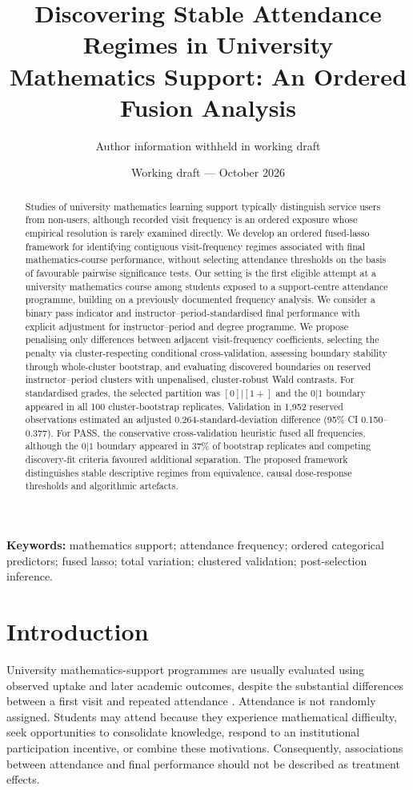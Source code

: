 \documentclass[11pt]{article}
\title{Discovering Stable Attendance Regimes in University Mathematics Support: An Ordered Fusion Analysis}
\author{Author information withheld in working draft}
\date{Working draft --- October 2026}
\begin{document}
\maketitle

\begin{abstract}
Studies of university mathematics learning support typically distinguish service users from non-users, although recorded visit frequency is an ordered exposure whose empirical resolution is rarely examined directly. We develop an ordered fused-lasso framework for identifying contiguous visit-frequency regimes associated with final mathematics-course performance, without selecting attendance thresholds on the basis of favourable pairwise significance tests. Our setting is the first eligible attempt at a university mathematics course among students exposed to a support-centre attendance programme, building on a previously documented frequency analysis. We consider a binary pass indicator and instructor--period-standardised final performance with explicit adjustment for instructor--period and degree programme. We propose penalising only differences between adjacent visit-frequency coefficients, selecting the penalty via cluster-respecting conditional cross-validation, assessing boundary stability through whole-cluster bootstrap, and evaluating discovered boundaries on reserved instructor--period clusters with unpenalised, cluster-robust Wald contrasts. For standardised grades, the selected partition was $[0]|[1+]$ and the $0|1$ boundary appeared in all 100 cluster-bootstrap replicates. Validation in 1,952 reserved observations estimated an adjusted 0.264-standard-deviation difference (95\% CI 0.150--0.377). For PASS, the conservative cross-validation heuristic fused all frequencies, although the $0|1$ boundary appeared in 37\% of bootstrap replicates and competing discovery-fit criteria favoured additional separation. The proposed framework distinguishes stable descriptive regimes from equivalence, causal dose-response thresholds and algorithmic artefacts.
\end{abstract}

\noindent\textbf{Keywords:} mathematics support; attendance frequency; ordered categorical predictors; fused lasso; total variation; clustered validation; post-selection inference.

\section{Introduction}
University mathematics-support programmes are usually evaluated using observed uptake and later academic outcomes, despite the substantial differences between a first visit and repeated attendance \citep{matthews2013,lawson2020,mullen2024}. Attendance is not randomly assigned. Students may attend because they experience mathematical difficulty, seek opportunities to consolidate knowledge, respond to an institutional participation incentive, or combine these motivations. Consequently, associations between attendance and final performance should not be described as treatment effects.
\end{document}
